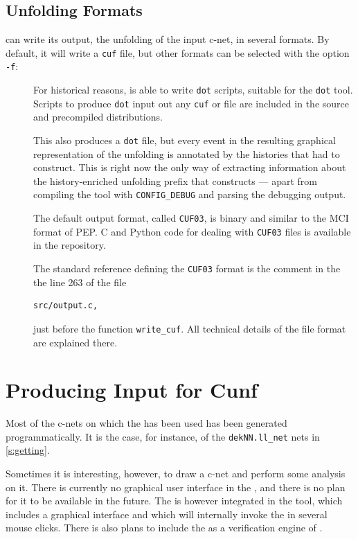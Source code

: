 \documentclass[a4paper]{refart}
\begin{document}
\subsection{Unfolding Formats}%
\label{s:oformat}

\cunf can write its output, the unfolding of the input c-net,
in several formats. By default, it will write a \verb!cuf! file, but
other formats can be selected with the option \verb!-f!:
\begin{description}
\item[]
  For historical reasons, \cunf is able to write \verb!dot!  scripts,
  suitable for the \verb!dot! tool.
  Scripts to produce \verb!dot! input out any \verb!cuf! or file are
  included in the source and precompiled distributions.

\item[]
  This also produces a \verb!dot! file, but every event in the resulting
  graphical representation of the unfolding is annotated by the histories
  that \cunf had to construct.  This is right now the only way of
  extracting information about the history-enriched unfolding prefix that
  \cunf constructs --- apart from compiling the tool with
  \verb!CONFIG_DEBUG! and parsing the debugging output.

\item[]
 The default output format, called \verb!CUF03!, is binary and similar to
 the MCI format of PEP.  C and Python code for dealing with \verb!CUF03!
 files is available in the repository.
 
 The standard reference defining the \verb!CUF03! format is the comment in
 the the line 263 of the file
\begin{verbatim}
src/output.c,
\end{verbatim}
 just before the function \verb!write_cuf!.  All technical
 details of the file format are explained there.
\end{description}

\section{Producing Input for Cunf}%
\label{s:producing}

Most of the c-nets on which the \cunft{} has been used has been
generated programmatically.  It is the case, for instance, of the
\verb!dekNN.ll_net! nets in \cref{s:getting}.

Sometimes it is interesting, however, to draw a c-net and perform some
analysis on it.
There is currently no graphical user interface in the \cunft{}, and there is
no plan for it to be available in the future.
The \cunft{} is however integrated in the \cosyverif\cite{Cosyverif} tool,
which includes a graphical interface and which will internally invoke the
\cunft{} in several mouse clicks.
There is also plans to include the \cunft{} as a verification engine
of \tapaal\cite{DJJJMS12}.
\end{document}
